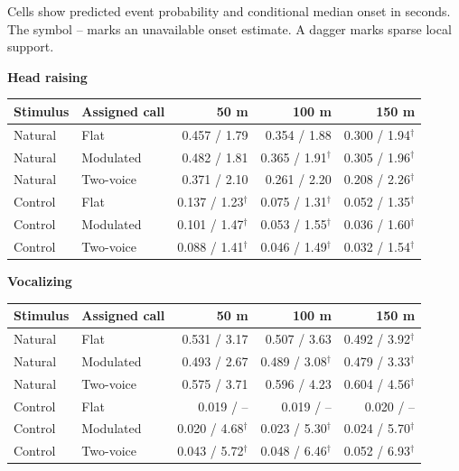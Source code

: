 Cells show predicted event probability and conditional median onset in seconds.
The symbol -- marks an unavailable onset estimate. A dagger marks sparse local support.
\begin{center}\begin{minipage}{.94\linewidth}\centering\small
\textbf{Head raising}\\[3pt]
\begin{tabular}{llrrr}\toprule
Stimulus & Assigned call & 50 m & 100 m & 150 m\\\midrule
Natural & Flat & 0.457 / 1.79 & 0.354 / 1.88 & 0.300 / 1.94$^\dagger$\\
Natural & Modulated & 0.482 / 1.81 & 0.365 / 1.91$^\dagger$ & 0.305 / 1.96$^\dagger$\\
Natural & Two-voice & 0.371 / 2.10 & 0.261 / 2.20 & 0.208 / 2.26$^\dagger$\\
Control & Flat & 0.137 / 1.23$^\dagger$ & 0.075 / 1.31$^\dagger$ & 0.052 / 1.35$^\dagger$\\
Control & Modulated & 0.101 / 1.47$^\dagger$ & 0.053 / 1.55$^\dagger$ & 0.036 / 1.60$^\dagger$\\
Control & Two-voice & 0.088 / 1.41$^\dagger$ & 0.046 / 1.49$^\dagger$ & 0.032 / 1.54$^\dagger$\\
\bottomrule\end{tabular}
\end{minipage}\end{center}
\begin{center}\begin{minipage}{.94\linewidth}\centering\small
\textbf{Vocalizing}\\[3pt]
\begin{tabular}{llrrr}\toprule
Stimulus & Assigned call & 50 m & 100 m & 150 m\\\midrule
Natural & Flat & 0.531 / 3.17 & 0.507 / 3.63 & 0.492 / 3.92$^\dagger$\\
Natural & Modulated & 0.493 / 2.67 & 0.489 / 3.08$^\dagger$ & 0.479 / 3.33$^\dagger$\\
Natural & Two-voice & 0.575 / 3.71 & 0.596 / 4.23 & 0.604 / 4.56$^\dagger$\\
Control & Flat & 0.019 / -- & 0.019 / -- & 0.020 / --\\
Control & Modulated & 0.020 / 4.68$^\dagger$ & 0.023 / 5.30$^\dagger$ & 0.024 / 5.70$^\dagger$\\
Control & Two-voice & 0.043 / 5.72$^\dagger$ & 0.048 / 6.46$^\dagger$ & 0.052 / 6.93$^\dagger$\\
\bottomrule\end{tabular}
\end{minipage}\end{center}
